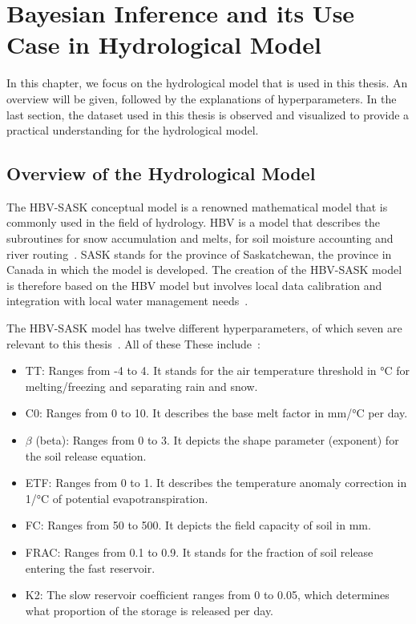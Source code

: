 \chapter{Bayesian Inference and its Use Case in Hydrological Model}

In this chapter, we focus on the hydrological model that is used in this thesis. An overview will be given, followed by the explanations of hyperparameters. In the last section, the dataset used in this thesis is observed and visualized to provide a practical understanding for the hydrological model.


\section{Overview of the Hydrological Model}
The HBV-SASK conceptual model is a renowned mathematical model that is commonly used in the field of hydrology. HBV is a model that describes the subroutines for snow accumulation and melts, for soil moisture accounting and river routing~\cite{hbv}. SASK stands for the province of Saskatchewan, the province in Canada in which the model is developed. The creation of the HBV-SASK model is therefore based on the HBV model but involves local data calibration and integration with local water management needs~\cite{sask}.

The HBV-SASK model has twelve different hyperparameters, of which seven are relevant to this thesis~\cite{ivana_relevant_params}. All of these These include~\cite{hydrology}:

\begin{itemize}
  \item TT: Ranges from -4 to 4. It stands for the air temperature threshold in °C for melting/freezing and separating rain and snow.
  \item C0: Ranges from 0 to 10. It describes the base melt factor in mm/°C per day.
  \item $\beta$ (beta): Ranges from 0 to 3. It depicts the shape parameter (exponent) for the soil release equation.
  \item ETF: Ranges from 0 to 1. It describes the temperature anomaly correction in 1/°C of potential evapotranspiration.
  \item FC: Ranges from 50 to 500. It depicts the field capacity of soil in mm.
  \item FRAC: Ranges from 0.1 to 0.9. It stands for the fraction of soil release entering the fast reservoir.
  \item K2: The slow reservoir coefﬁcient ranges from 0 to 0.05, which determines what proportion of the storage is released per day.
\end{itemize}

